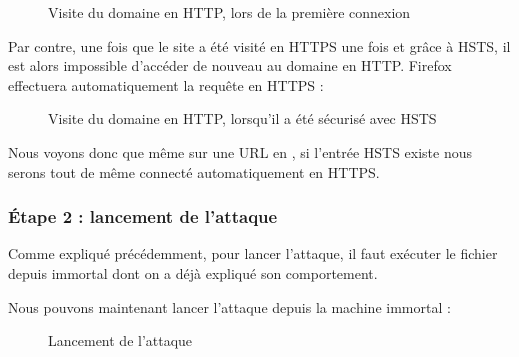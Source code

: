 \begin{figure}[H]
  \caption{Visite du domaine en HTTP, lors de la première connexion}
\end{figure}

Par contre, une fois que le site a été visité en HTTPS une fois et grâce à HSTS, il est alors impossible d'accéder de nouveau au domaine  en HTTP. Firefox effectuera automatiquement la requête en HTTPS :

\begin{figure}[H]
  \caption{Visite du domaine en HTTP, lorsqu'il a été sécurisé avec HSTS}
\end{figure}

Nous voyons donc que même sur une URL en , si l'entrée HSTS existe nous serons tout de même connecté automatiquement en HTTPS.

\subsubsection{Étape 2 : lancement de l'attaque}

Comme expliqué précédemment, pour lancer l'attaque, il faut exécuter le fichier  depuis immortal dont on a déjà expliqué son comportement.

Nous pouvons maintenant lancer l'attaque depuis la machine immortal :


\begin{figure}[H]
  \caption{Lancement de l'attaque}
\end{figure}

